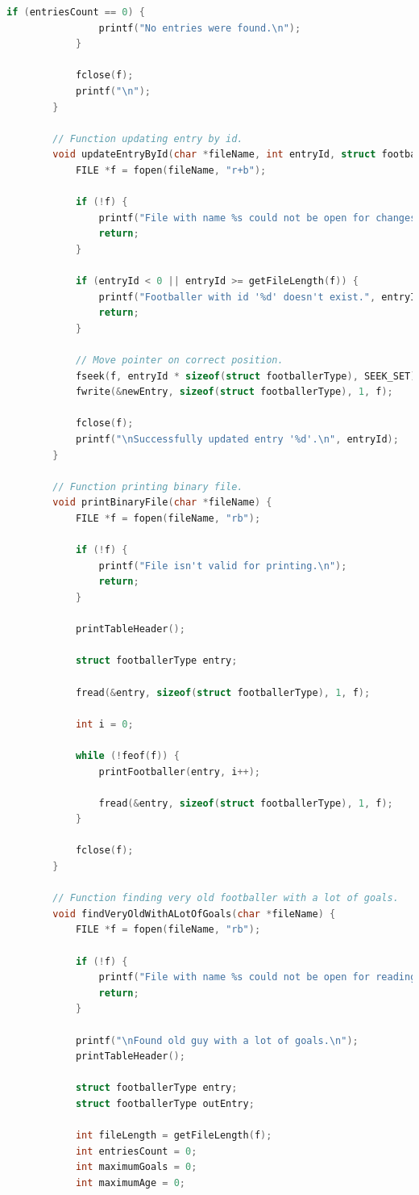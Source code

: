 \documentclass[12pt]{article}
\begin{document}
\begin{lstlisting}[language=C]
			if (entriesCount == 0) {
				printf("No entries were found.\n");
			}
			
			fclose(f);
			printf("\n");
		}
		
		// Function updating entry by id.
		void updateEntryById(char *fileName, int entryId, struct footballerType newEntry) {
			FILE *f = fopen(fileName, "r+b");
			
			if (!f) {
				printf("File with name %s could not be open for changes.\n", fileName);
				return;
			}
			
			if (entryId < 0 || entryId >= getFileLength(f)) {
				printf("Footballer with id '%d' doesn't exist.", entryId);
				return;
			}
			
			// Move pointer on correct position.
			fseek(f, entryId * sizeof(struct footballerType), SEEK_SET);
			fwrite(&newEntry, sizeof(struct footballerType), 1, f);
			
			fclose(f);
			printf("\nSuccessfully updated entry '%d'.\n", entryId);
		}
		
		// Function printing binary file.
		void printBinaryFile(char *fileName) {
			FILE *f = fopen(fileName, "rb");
			
			if (!f) {
				printf("File isn't valid for printing.\n");
				return;
			}
			
			printTableHeader();
			
			struct footballerType entry;
			
			fread(&entry, sizeof(struct footballerType), 1, f);
			
			int i = 0;
			
			while (!feof(f)) {
				printFootballer(entry, i++);
				
				fread(&entry, sizeof(struct footballerType), 1, f);
			}
			
			fclose(f);
		}
		
		// Function finding very old footballer with a lot of goals.
		void findVeryOldWithALotOfGoals(char *fileName) {
			FILE *f = fopen(fileName, "rb");
			
			if (!f) {
				printf("File with name %s could not be open for reading.\n", fileName);
				return;
			}
			
			printf("\nFound old guy with a lot of goals.\n");
			printTableHeader();
			
			struct footballerType entry;
			struct footballerType outEntry;
			
			int fileLength = getFileLength(f);
			int entriesCount = 0;
			int maximumGoals = 0;
			int maximumAge = 0;
			

\end{lstlisting}
\end{document}
